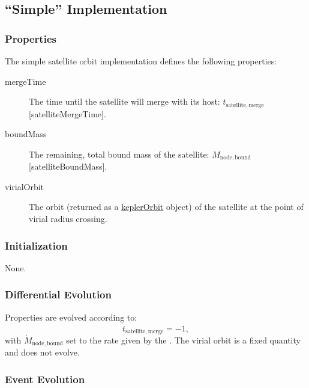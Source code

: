 \subsection{``Simple'' Implementation}\label{sec:SatelliteOrbitComponentSimple}

\subsubsection{Properties}

The simple satellite orbit implementation defines the following properties:
\begin{description}
 \item [{\normalfont \ttfamily mergeTime}] The time until the satellite will merge with its host: $t_\mathrm{satellite, merge}$ [{\normalfont \ttfamily satelliteMergeTime}].
 \item [{\normalfont \ttfamily boundMass}] The remaining, total bound mass of the satellite: $M_\mathrm{node,bound}$ [{\normalfont \ttfamily satelliteBoundMass}].
 \item[{\normalfont \ttfamily virialOrbit}] The orbit (returned as a \href{https://github.com/galacticusorg/galacticus/releases/download/bleeding-edge/Galacticus_Development.pdf\#sec.KeplerOrbits}{\normalfont \ttfamily keplerOrbit} object) of the satellite at the point of virial radius crossing.
\end{description}

\subsubsection{Initialization}

None.

\subsubsection{Differential Evolution}

Properties are evolved according to:
\begin{equation}
 \dot{t}_\mathrm{satellite, merge} = -1,
\end{equation}
with $\dot{M}_\mathrm{node,bound}$ set to the rate given by the . The virial orbit is a fixed quantity and does not evolve.

\subsubsection{Event Evolution}

